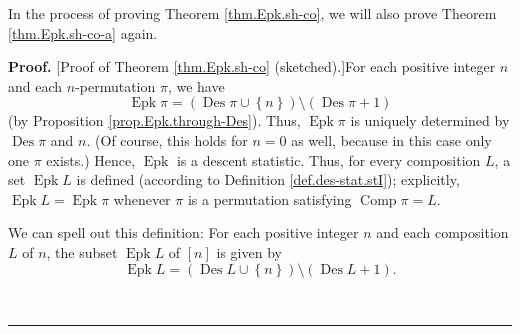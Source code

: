 \documentclass[numbers=enddot,12pt,final,onecolumn,notitlepage]{scrartcl}%
\theoremstyle{definition}
\newenvironment{proof}[1][Proof]{\noindent\textbf{#1.} }{\ \rule{0.5em}{0.5em}}
\newenvironment{verlong}{}{}
\newenvironment{noncompile}{}{}
\begin{document}
\begin{verlong}
In the process of proving Theorem \ref{thm.Epk.sh-co}, we will also prove
Theorem \ref{thm.Epk.sh-co-a} again.

\begin{proof}
[Proof of Theorem \ref{thm.Epk.sh-co} (sketched).]For each positive integer
$n$ and each $n$-permutation $\pi$, we have%
\[
\operatorname*{Epk}\pi=\left(  \operatorname*{Des}\pi\cup\left\{  n\right\}
\right)  \setminus\left(  \operatorname*{Des}\pi+1\right)
\]
(by Proposition \ref{prop.Epk.through-Des}). Thus, $\operatorname*{Epk}\pi$ is
uniquely determined by $\operatorname*{Des}\pi$ and $n$. (Of course, this
holds for $n=0$ as well, because in this case only one $\pi$ exists.) Hence,
$\operatorname*{Epk}$ is a descent statistic. Thus, for every composition $L$,
a set $\operatorname*{Epk}L$ is defined (according to Definition
\ref{def.des-stat.stI}); explicitly, $\operatorname*{Epk}L=\operatorname*{Epk}%
\pi$ whenever $\pi$ is a permutation satisfying $\operatorname*{Comp}\pi=L$.

\begin{noncompile}
We can spell out this definition: For each positive integer $n$ and each
composition $L$ of $n$, the subset $\operatorname*{Epk}L$ of $\left[
n\right]  $ is given by%
\[
\operatorname*{Epk}L=\left(  \operatorname*{Des}L\cup\left\{  n\right\}
\right)  \setminus\left(  \operatorname*{Des}L+1\right)  .
\]

\end{noncompile}


\end{proof}
\end{verlong}
\end{document}
